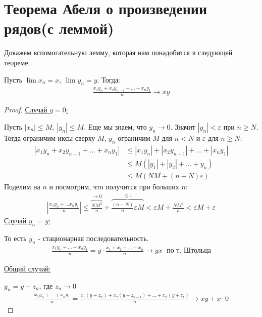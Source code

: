 \section{Теорема Абеля о произведении рядов(с леммой)}
Докажем вспомогательную лемму, которая нам понадобится в следующей теореме.
\begin{lemma}
    Пусть $\lim x_n = x,\ \lim y_n = y$. Тогда:
    \begin{gather*}
        \frac{x_1 y_n + x_2y_{n-1} + \ldots + x_ny_1}{n} \to xy
    \end{gather*}
\end{lemma}
\begin{proof} \quad 

    \underline{Случай $y = 0$:}

    Пусть $|x_n| \leq M,\ |y_n| \leq M$. Еще мы знаем, что $y_n \to 0$. Значит $|y_n| < \varepsilon$ при $n \geq N$.
    Тогда ограничим иксы сверху $M$, $y_n$ ограничим $M$ для $n < N$ и $\varepsilon$ для $n \geqslant N$:
    \begin{align*}
        |x_1y_n + x_2y_{n-1} + \ldots + x_ny_1| &\leqslant |x_1y_n| + |x_2y_{n-1}| + \ldots + |x_ny_1| \\
        &\leqslant M(|y_1|+|y_2|+\ldots + y_n) \\
        &\leqslant M(NM + (n-N)\varepsilon)
    \end{align*}
    Поделим на $n$ и посмотрим, что получится при больших $n$:
    \begin{gather*}
        \left|\frac{x_1y_n+\ldots x_ny_1}{n}\right|
        \leqslant \overbrace{\frac{NM^2}{n}}^{\to 0} +  \overbrace{\frac{(n-N)}{n}\varepsilon M}^{\leq 1} 
        < \varepsilon M + \frac{NM^2}{n}
        < \varepsilon M + \varepsilon
    \end{gather*}
    \underline{Случай $y_n = y$:} 
    
    То есть $y_n$ - стационарная последовательность.
    \begin{gather*}
        \frac{x_1y_n + \ldots + x_ny_1}{n} = y \cdot \frac{x_1+x_2+\ldots+x_n}{n} \longrightarrow yx \; \text{ по т. Штольца}
    \end{gather*}

    \underline{Общий случай:} 
    
    $y_n = y+z_n$, где $z_n \longrightarrow 0$
    \begin{gather*}
        \frac{x_1y_n + \ldots + x_ny_1}{n} = \frac{x_1(y+z_n) + x_2(y+z_{n-1}) + \ldots + x_n(y+z_1)}{n} \longrightarrow xy + x\cdot 0
    \end{gather*}
\end{proof}
